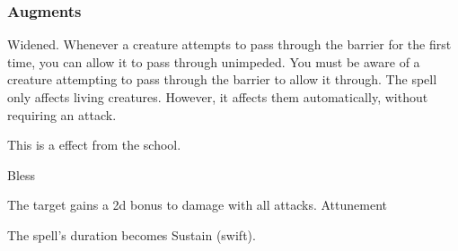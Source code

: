 \subsubsection{Augments}
 Widened.
Whenever a creature attempts to pass through the barrier for the first time, you can allow it to pass through unimpeded.
You must be aware of a creature attempting to pass through the barrier to allow it through.
The spell only affects living creatures.
However, it affects them automatically, without requiring an attack.
\par
This is a  effect from the  school.
\begin{spellsection}{Bless}
\begin{spellheader}
\end{spellheader}
\begin{spellcontent}
\begin{spelltargetinginfo}
\end{spelltargetinginfo}
\begin{spelleffects}
\spelleffect The target gains a \plus2d bonus to damage with all attacks.
\spelldur Attunement
\end{spelleffects}
\end{spellcontent}
\begin{spellfooter}
\miscastexplode
\end{spellfooter}
\begin{spellcantrip}
The spell's duration becomes Sustain (swift).
\end{spellcantrip}
\end{spellsection}
